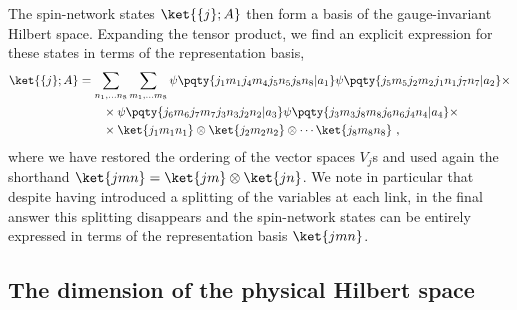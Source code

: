 The spin-network states $\ket{ \{j\};A}$ then form a basis of the gauge-invariant Hilbert space.
Expanding the tensor product, we find an explicit expression for these states in terms of the representation basis,
\begin{align}
    \ket{ \{j\};A} &= \sum_{n_1, \ldots n_8} \sum_{m_1, \ldots m_8} \psi\pqty{j_1 m_1 j_4 m_4 j_5 n_5 j_8 n_8 | a_1} \psi\pqty{j_5 m_5 j_2 m_2 j_1 n_1 j_7 n_7 | a_2} \times \\
    &\quad \quad \times \psi\pqty{j_6 m_6 j_7 m_7 j_3 n_3 j_2 n_2 | a_3} \psi\pqty{j_3 m_3 j_8 m_8 j_6 n_6 j_4 n_4 | a_4} \times \\
    &\quad \quad \times \ket{j_1 m_1 n_1} \otimes \ket{j_2 m_2 n_2} \otimes \cdots \ket{j_8 m_8 n_8} \ ,
\end{align}
where we have restored the ordering of the vector spaces $V_j$s and used again the shorthand $\ket{jmn}=\ket{jm}\otimes \ket{jn}$.
We note in particular that despite having introduced a splitting of the variables at each link, in the final answer this splitting disappears and the spin-network states can be entirely expressed in terms of the representation basis $\ket{jmn}$.

\subsection{The dimension of the physical Hilbert space}\label{sub:dimension_physical_hilbert_space}

